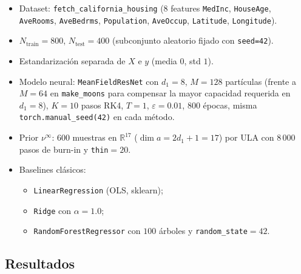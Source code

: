 \documentclass[11pt, a4paper]{article}
\theoremstyle{definition}
\newcommand{\eps}{\varepsilon}
\begin{document}
\begin{itemize}
  \item Dataset: \texttt{fetch\_california\_housing} (8 features
        \texttt{MedInc}, \texttt{HouseAge}, \texttt{AveRooms},
        \texttt{AveBedrms}, \texttt{Population},
        \texttt{AveOccup}, \texttt{Latitude}, \texttt{Longitude}).
  \item $N_{\mathrm{train}}=800$, $N_{\mathrm{test}}=400$
        (subconjunto aleatorio fijado con \texttt{seed=42}).
  \item Estandarización separada de $X$ e $y$ (media $0$, std $1$).
  \item Modelo neural: \texttt{MeanFieldResNet} con $d_1=8$,
        $M=128$ partículas (frente a $M=64$ en \texttt{make\_moons}
        para compensar la mayor capacidad requerida en $d_1=8$),
        $K=10$ pasos RK4, $T=1$, $\eps=0.01$, $800$ épocas, misma
        \texttt{torch.manual\_seed(42)} en cada método.
  \item Prior $\nu^\infty$: $600$ muestras en $\mathbb R^{17}$
        ($\dim a = 2 d_1 + 1 = 17$) por ULA con $8\,000$ pasos de
        burn-in y \texttt{thin}$=20$.
  \item Baselines clásicos:
        \begin{itemize}
          \item \texttt{LinearRegression} (OLS, sklearn);
          \item \texttt{Ridge} con $\alpha=1.0$;
          \item \texttt{RandomForestRegressor} con $100$ árboles
                y \texttt{random\_state}$=42$.
        \end{itemize}
\end{itemize}

\subsection{Resultados}
\label{sec:reg-d8-resultados}
\end{document}

